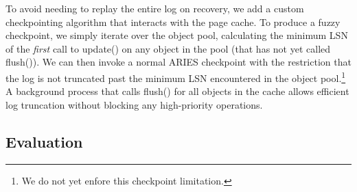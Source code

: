 \documentclass[letterpaper,twocolumn,english]{article}
\begin{document}
To avoid needing to replay the entire log on recovery, we add a custom
checkpointing algorithm that interacts with the page cache.  
To produce a
fuzzy checkpoint, we simply iterate over the object pool, calculating
the minimum LSN of the {\em first} call to update() on any object in
the pool (that has not yet called flush()). 
We can then invoke a normal ARIES checkpoint with the restriction
that the log is not truncated past the minimum LSN encountered in the
object pool.\footnote{We do not yet enfore this checkpoint limitation.}
A background process that calls flush() for all objects in the cache
allows efficient log truncation without blocking any high-priority 
operations.

\subsection{Evaluation}
\end{document}
